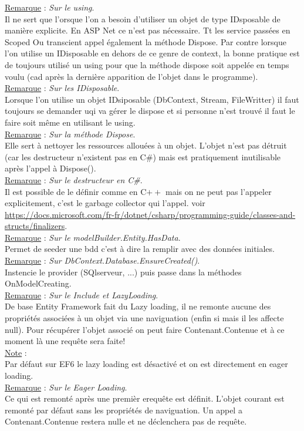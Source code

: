 \documentclass[a4paper,12pt,twoside]{article}
\newcommand{\rem}[2]{\noindent\underline{Remarque} : \textit{#1}.\\ \indent #2}
\newcommand{\note}[1]{\noindent\underline{Note} : \\ \indent #1}
\begin{document}
\rem{Sur le using}{Il ne sert que l'orsque l'on a besoin d'utiliser un objet de type IDsposable de manière explicite. En ASP Net ce n'est pas nécessaire. Tt les service passées en Scoped Ou transcient appel également la méthode Dispose. Par contre lorsque l'on utilise un IDisposable en dehors de ce genre de context, la bonne pratique est de toujours utilisé un using pour que la méthode dispose soit appelée en temps voulu (cad après la dernière apparition de l'objet dans le programme).}\\

\rem{Sur les IDisposable}{Lorsque l'on utilise un objet IDsiposable (DbContext, Stream, FileWritter) il faut toujours se demander uqi va gérer le dispose et si personne n'est trouvé il faut le faire soit même en utilisant le using.}\\

\rem{Sur la méthode Dispose}{Elle sert à nettoyer les ressources allouées à un objet. L'objet n'est pas détruit (car les destructeur n'existent pas en C\#) mais est pratiquement inutilisable après l'appel à Dispose().}\\

\rem{Sur le destructeur en C\#}{Il est possible de le définir comme en C$++$ mais on ne peut pas l'appeler explicitement, c'est le garbage collector qui l'appel. voir \url{https://docs.microsoft.com/fr-fr/dotnet/csharp/programming-guide/classes-and-structs/finalizers}.}\\

\rem{Sur le modelBuilder.Entity.HasData}{Permet de seeder une bdd c'est à dire la remplir avec des données initiales.}\\

\rem{Sur DbContext.Database.EnsureCreated()}{Instencie le provider (SQlserveur, ...) puis passe dans la méthodes OnModelCreating.}\\

\rem{Sur le Include et LazyLoading}{De base Entity Framework fait du Lazy loading, il ne remonte aucune des propriétés associées à un objet via une naviguation (enfin si mais il les affecte null). Pour récupérer l'objet associé on peut faire Contenant.Contenue et à ce moment là une requête sera faite!}\\

\note{Par défaut sur EF6 le lazy loading est désactivé et on est directement en eager loading.}\\

\rem{Sur le Eager Loading}{Ce qui est remonté après une premièr erequête est définit. L'objet courant est remonté par défaut sans les propriétés de naviguation. Un appel a Contenant.Contenue restera nulle et ne déclenchera pas de requête.}\\
\end{document}
